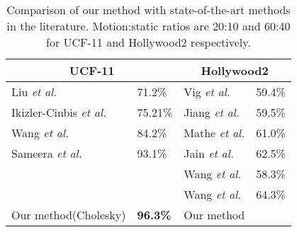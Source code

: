 \begin{table}[]
\centering
\caption{Comparison of our method with state-of-the-art methods in the literature. Motion:static ratios are 20:10 and 60:40 for
UCF-11 and Hollywood2 respectively.}\label{tbl:comparison}
\begin{tabular}{|l|l||l|l|}
\hline
\multicolumn{2}{|c||}{UCF-11}    & \multicolumn{2}{c|}{Hollywood2} \\ \hline
Liu \textit{et al.}\cite{liu2009recognizing}            & 71.2\%  & Vig \textit{et al.}\cite{vig2012space}           & 59.4\%      \\
Ikizler-Cinbis \textit{et al.}\cite{ikizler2010object} & 75.21\% & Jiang \textit{et al.}\cite{jiang2012trajectory}      & 59.5\%      \\
Wang \textit{et al.}\cite{wang2011action}    & 84.2\%  & Mathe \textit{et al.}\cite{mathe2012dynamic}         & 61.0\%      \\
Sameera \textit{et al.}\cite{7486474}         & 93.1\%        & Jain \textit{et al.}\cite{jain2013better}           & 62.5\%      \\
                      &         & Wang \textit{et al.}\cite{wang2011action}             & 58.3\%      \\
                      &         & Wang \textit{et al.}\cite{wang2013action}          & 64.3\%      \\ \hline \hline
Our method(Cholesky)  & \textbf{96.3\%}       & Our method        &             \\ \hline

\end{tabular}

\end{table}




